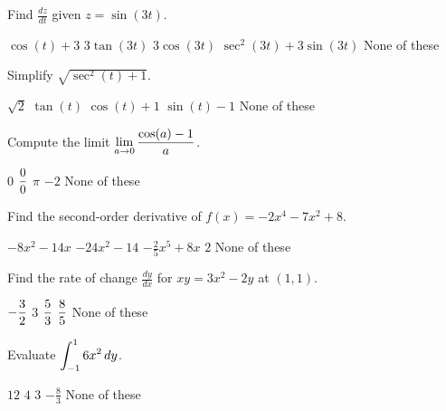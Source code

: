 \documentclass[12pt]{exam}
\newcommand{\ds}{\ensuremath{\displaystyle}}
\begin{document}
\begin{questions}

\setcounter{question}{0}

\question[5]
Find $\frac{dz}{dt}$ given $z=\sin(3t)$.

\begin{checkboxes}
\choice $\cos(t) + 3$
\choice $3\tan(3t)$
\CorrectChoice $3\cos(3t)$
\choice $\sec^2(3t) + 3\sin(3t)$
\choice None of these
\end{checkboxes}

\vfill

\question[5]
Simplify $\sqrt{\sec^2(t)+1}$.

\begin{checkboxes}
\choice $\sqrt{2}$
\CorrectChoice $\tan(t)$
\choice $\cos(t)+1$
\choice $\sin(t)-1$
\choice None of these
\end{checkboxes}

\vfill

\question[5]
Compute the limit $\ds\lim_{a\to 0}\frac{\cos(a)-1}{a}$.

\begin{checkboxes}
\CorrectChoice $0$
\choice $\ds\frac{0}{0}$
\choice $\pi$
\choice $-2$
\choice None of these
\end{checkboxes}

\vfill

\question[5]
Find the second-order derivative of $f(x)=-2x^4-7x^2+8$.

\begin{checkboxes}
\choice $-8x^2-14x$
\CorrectChoice $-24x^2-14$
\choice $-\frac{2}{5}x^5+8x$
\choice $2$
\choice None of these
\end{checkboxes}

\vfill

\newpage

\question[5]
Find the rate of change $\frac{dy}{dx}$ for $xy=3x^2-2y$ at $(1,1)$.

\begin{checkboxes}
\choice $\ds-\frac{3}{2}$
\choice $3$
\CorrectChoice $\ds\frac{5}{3}$
\choice $\ds\frac{8}{5}$
\choice None of these
\end{checkboxes}

\vfill

\question[5]
Evaluate $\ds\int_{-1}^1 6x^2 \,dy$.

\begin{checkboxes}
\choice $12$
\CorrectChoice $4$
\choice $3$
\choice $-\frac{8}{3}$
\choice None of these
\end{checkboxes}


\end{questions}
\end{document}
